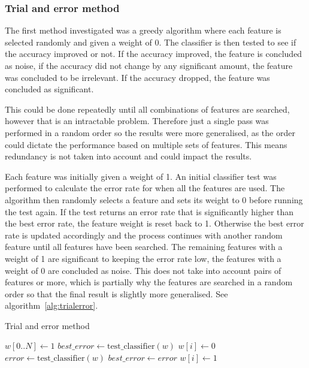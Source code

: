 \subsubsection{Trial and error method}
The first method investigated was a greedy algorithm where each feature is selected randomly and given a weight of 0. The
classifier is then tested to see if the accuracy improved or not. If the accuracy improved, the feature is concluded as noise,
if the accuracy did not change by any significant amount, the feature was concluded to be irrelevant. If the accuracy dropped,
the feature was concluded as significant.

This could be done repeatedly until all combinations of features are searched, however that is an intractable problem. Therefore
just a single pass was performed in a random order so the results were more generalised, as the order could dictate the
performance based on multiple sets of features. This means redundancy is not taken into account and could impact the results.

Each feature was initially given a weight of 1. An initial classifier test was performed to calculate the error rate for when
all the features are used. The algorithm then randomly selects a feature and sets its weight to 0 before running the test again.
If the test returns an error rate that is significantly higher than the best error rate, the feature weight is reset back to 1.
Otherwise the best error rate is updated accordingly and the process continues with another random feature until all features
have been searched. The remaining features with a weight of 1 are significant to keeping the error rate low, the features with a
weight of 0 are concluded as noise. This does not take into account pairs of features or more, which is partially why the
features are searched in a random order so that the final result is slightly more generalised.
See algorithm~\ref{alg:trialerror}.

\begin{algorithm}
    \caption{Trial and error method}
    \label{alg:trialerror}
    \begin{algorithmic}
        \STATE $w[0..N] \gets 1$
        \STATE $best\_ error \gets \mathrm{test\_ classifier}(w)$
            \STATE $w[i] \gets 0$
            \STATE $error \gets \mathrm{test\_ classifier}(w)$
                \STATE $best\_error \gets error$
                \STATE $w[i] \gets 1$
            \ENDIF
        \ENDFOR
    \end{algorithmic}
\end{algorithm}

